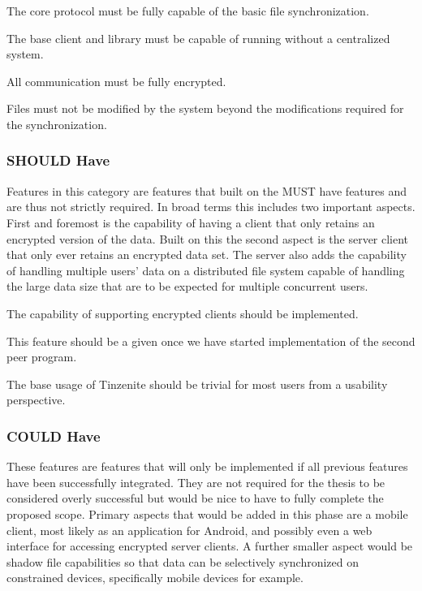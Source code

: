 \begin{description}[leftmargin=13em,style=nextline,noitemsep,nolistsep]
\item[Protocol]
    The core protocol must be fully capable of the basic file synchronization.
\item[Peer to Peer Architecture]
    The base client and library must be capable of running without a centralized system.
\item[Secure Transport]
    All communication must be fully encrypted.
\item[Object Atomicity]
    Files must not be modified by the system beyond the modifications required for the synchronization.
\end{description}

\subsubsection{SHOULD Have}
\label{subs:SHOULD Have}

Features in this category are features that built on the MUST have features and are thus not strictly required.
In broad terms this includes two important aspects.
First and foremost is the capability of having a client that only retains an encrypted version of the data.
Built on this the second aspect is the server client that only ever retains an encrypted data set.
The server also adds the capability of handling multiple users' data on a distributed file system capable of handling the large data size that are to be expected for multiple concurrent users.

\begin{description}[leftmargin=9em,style=nextline,noitemsep,nolistsep]
\item[Third Party Client]
    The capability of supporting encrypted clients should be implemented.
\item[Client Agnostic]
    This feature should be a given once we have started implementation of the second peer program.
\item[Usability]
    The base usage of Tinzenite should be trivial for most users from a usability perspective.
\end{description}

\subsubsection{COULD Have}
\label{subs:COULD Have}

These features are features that will only be implemented if all previous features have been successfully integrated.
They are not required for the thesis to be considered overly successful but would be nice to have to fully complete the proposed scope.
Primary aspects that would be added in this phase are a mobile client, most likely as an application for Android, and possibly even a web interface for accessing encrypted server clients.
A further smaller aspect would be shadow file capabilities so that data can be selectively synchronized on constrained devices, specifically mobile devices for example.

